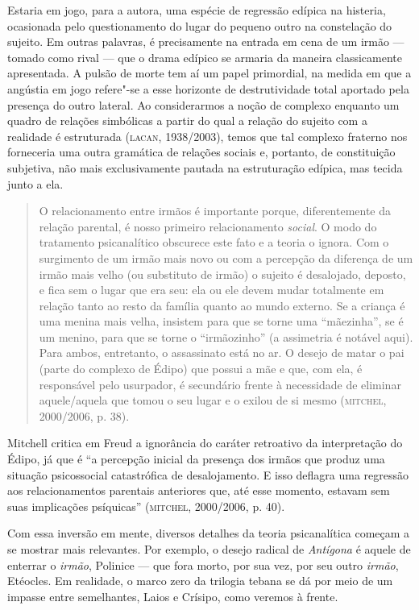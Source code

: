 Estaria em jogo, para a autora, uma espécie de regressão edípica na
histeria, ocasionada pelo questionamento do lugar do pequeno outro na
constelação do sujeito. Em outras palavras, é precisamente na entrada em
cena de um irmão --- tomado como rival --- que o drama edípico se
armaria da maneira classicamente apresentada. A pulsão de morte tem aí
um papel primordial, na medida em que a angústia em jogo refere"-se a
esse horizonte de destrutividade total aportado pela presença do outro
lateral. Ao considerarmos a noção de complexo enquanto um quadro de
relações simbólicas a partir do qual a relação do sujeito com a
realidade é estruturada (\textsc{lacan}, 1938/2003), temos que tal complexo
fraterno nos forneceria uma outra gramática de relações sociais e,
portanto, de constituição subjetiva, não mais exclusivamente pautada na
estruturação edípica, mas tecida junto a ela.

\begin{quote}
O relacionamento entre irmãos é importante porque, diferentemente da
relação parental, é nosso primeiro relacionamento \emph{social}. O modo
do tratamento psicanalítico obscurece este fato e a teoria o ignora. Com
o surgimento de um irmão mais novo ou com a percepção da diferença de um
irmão mais velho (ou substituto de irmão) o sujeito é desalojado,
deposto, e fica sem o lugar que era seu: ela ou ele devem mudar
totalmente em relação tanto ao resto da família quanto ao mundo externo.
Se a criança é uma menina mais velha, insistem para que se torne uma
``mãezinha'', se é um menino, para que se torne o ``irmãozinho'' (a
assimetria é notável aqui). Para ambos, entretanto, o assassinato está
no ar. O desejo de matar o pai (parte do complexo de Édipo) que possui a
mãe e que, com ela, é responsável pelo usurpador, é secundário frente à
necessidade de eliminar aquele/aquela que tomou o seu lugar e o exilou
de si mesmo (\textsc{mitchel}, 2000/2006, p. 38).
\end{quote}

Mitchell critica em Freud a ignorância do caráter retroativo da
interpretação do Édipo, já que é ``a percepção inicial da presença dos
irmãos que produz uma situação psicossocial catastrófica de
desalojamento. E isso deflagra uma regressão aos relacionamentos
parentais anteriores que, até esse momento, estavam sem suas implicações
psíquicas'' (\textsc{mitchel}, 2000/2006, p. 40).

Com essa inversão em mente, diversos detalhes da teoria psicanalítica
começam a se mostrar mais relevantes. Por exemplo, o desejo radical de
\emph{Antígona} é aquele de enterrar o \emph{irmão}, Polinice --- que
fora morto, por sua vez, por seu outro \emph{irmão}, Etéocles. Em
realidade, o marco zero da trilogia tebana se dá por meio de um impasse
entre semelhantes, Laios e Crísipo, como veremos à frente.

